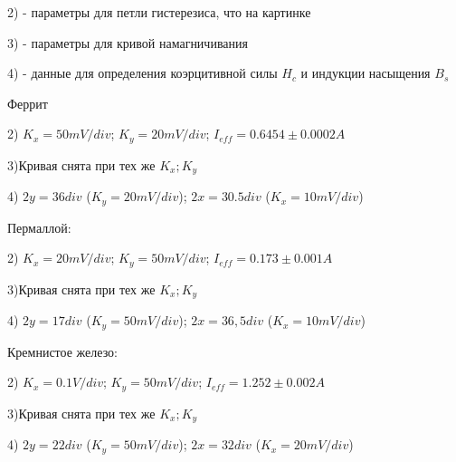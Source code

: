 \documentclass[a4paper,12pt]{article}
\begin{document}
2) - параметры для петли гистерезиса, что на картинке

3) - параметры для кривой намагничивания

4) - данные для определения коэрцитивной силы $H_c$ и индукции насыщения $B_s$

\medskip

Феррит 

2)
$K_x = 50mV/div$;
$K_y = 20mV/div$;
$I_{eff} = 0.6454 \pm 0.0002 A$

3)Кривая снята при тех же $K_x; K_y$

4)
$2y = 36 div$
($K_y = 20mV/div$);
$2x = 30.5 div$
($K_x = 10 mV/div$)
\medskip

Пермаллой:

2)
$K_x = 20mV/div$;
$K_y = 50mV/div$;
$I_{eff} = 0.173 \pm 0.001 A$

3)Кривая снята при тех же $K_x; K_y$

4)
$2y = 17 div$
($K_y = 50mV/div$);
$2x = 36,5 div$
($K_x = 10 mV/div$)
\medskip

Кремнистое железо:

2)
$K_x = 0.1V/div$;
$K_y = 50mV/div$;
$I_{eff} = 1.252 \pm 0.002 A$

3)Кривая снята при тех же $K_x; K_y$

4)
$2y = 22 div$
($K_y = 50mV/div$);
$2x = 32 div$
($K_x = 20 mV/div$)
\end{document}
